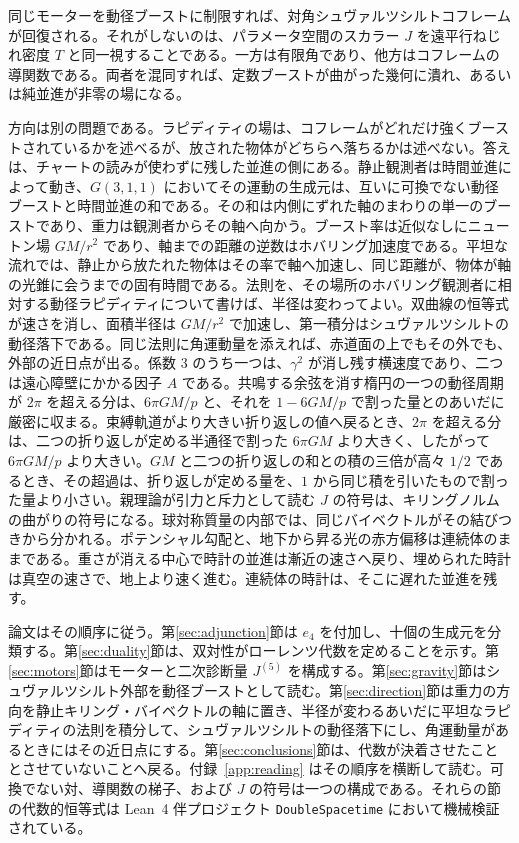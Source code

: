 \documentclass[a4paper]{article}
\begin{document}
同じモーターを動径ブーストに制限すれば、対角シュヴァルツシルトコフレームが回復される。それがしないのは、パラメータ空間のスカラー \(J\) を遠平行ねじれ密度 \(T\) と同一視することである。一方は有限角であり、他方はコフレームの導関数である。両者を混同すれば、定数ブーストが曲がった幾何に潰れ、あるいは純並進が非零の場になる。

方向は別の問題である。ラピディティの場は、コフレームがどれだけ強くブーストされているかを述べるが、放された物体がどちらへ落ちるかは述べない。答えは、チャートの読みが使わずに残した並進の側にある。静止観測者は時間並進によって動き、\(G(3,1,1)\) においてその運動の生成元は、互いに可換でない動径ブーストと時間並進の和である。その和は内側にずれた軸のまわりの単一のブーストであり、重力は観測者からその軸へ向かう。ブースト率は近似なしにニュートン場 \(GM/r^{2}\) であり、軸までの距離の逆数はホバリング加速度である。平坦な流れでは、静止から放たれた物体はその率で軸へ加速し、同じ距離が、物体が軸の光錐に会うまでの固有時間である。法則を、その場所のホバリング観測者に相対する動径ラピディティについて書けば、半径は変わってよい。双曲線の恒等式が速さを消し、面積半径は \(GM/r^{2}\) で加速し、第一積分はシュヴァルツシルトの動径落下である。同じ法則に角運動量を添えれば、赤道面の上でもその外でも、外部の近日点が出る。係数 \(3\) のうち一つは、\(\gamma^{2}\) が消し残す横速度であり、二つは遠心障壁にかかる因子 \(A\) である。共鳴する余弦を消す楕円の一つの動径周期が \(2\pi\) を超える分は、\(6\pi GM/p\) と、それを \(1-6GM/p\) で割った量とのあいだに厳密に収まる。束縛軌道がより大きい折り返しの値へ戻るとき、\(2\pi\) を超える分は、二つの折り返しが定める半通径で割った \(6\pi GM\) より大きく、したがって \(6\pi GM/p\) より大きい。\(GM\) と二つの折り返しの和との積の三倍が高々 \(1/2\) であるとき、その超過は、折り返しが定める量を、\(1\) から同じ積を引いたもので割った量より小さい。親理論が引力と斥力として読む \(J\) の符号は、キリングノルムの曲がりの符号になる。球対称質量の内部では、同じバイベクトルがその結びつきから分かれる。ポテンシャル勾配と、地下から昇る光の赤方偏移は連続体のままである。重さが消える中心で時計の並進は漸近の速さへ戻り、埋められた時計は真空の速さで、地上より速く進む。連続体の時計は、そこに遅れた並進を残す。

論文はその順序に従う。第\ref{sec:adjunction}節は \(e_{4}\) を付加し、十個の生成元を分類する。第\ref{sec:duality}節は、双対性がローレンツ代数を定めることを示す。第\ref{sec:motors}節はモーターと二次診断量 \(J^{(5)}\) を構成する。第\ref{sec:gravity}節はシュヴァルツシルト外部を動径ブーストとして読む。第\ref{sec:direction}節は重力の方向を静止キリング・バイベクトルの軸に置き、半径が変わるあいだに平坦なラピディティの法則を積分して、シュヴァルツシルトの動径落下にし、角運動量があるときにはその近日点にする。第\ref{sec:conclusions}節は、代数が決着させたこととさせていないことへ戻る。付録~\ref{app:reading} はその順序を横断して読む。可換でない対、導関数の梯子、および \(J\) の符号は一つの構成である。それらの節の代数的恒等式は Lean~4 伴プロジェクト \texttt{DoubleSpacetime} において機械検証されている。
\end{document}
